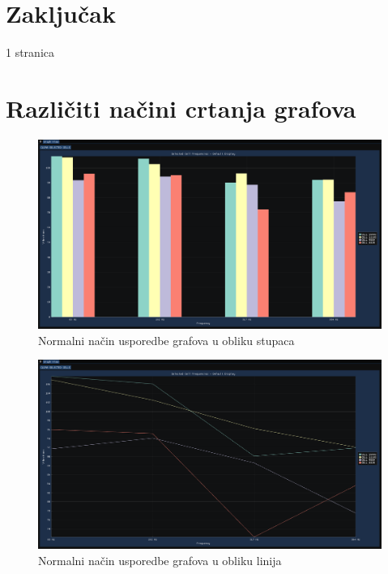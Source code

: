 \documentclass[times, utf8, diplomski]{fer}
\begin{document}
\chapter{Zaključak}
1 stranica




\appendix
\chapter{Različiti načini crtanja grafova} \label{appendix:graph-display-examples}

\begin{figure}[H]
	\centering
	\includegraphics[width=\textwidth]{default_graph_display_bars.png}
	\caption{Normalni način usporedbe grafova u obliku stupaca}
    \label{appendix:default_graph_display_bars}
\end{figure}

\begin{figure}[H]
	\centering
	\includegraphics[width=\textwidth]{default_graph_display_lines.png}
	\caption{Normalni način usporedbe grafova u obliku linija}
    \label{appendix:default_graph_display_lines}
\end{figure}
\end{document}
